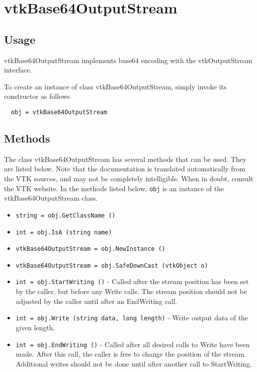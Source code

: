 \section{vtkBase64OutputStream}

\subsection{Usage}

 vtkBase64OutputStream implements base64 encoding with the
 vtkOutputStream interface.

To create an instance of class vtkBase64OutputStream, simply
invoke its constructor as follows
\begin{verbatim}
  obj = vtkBase64OutputStream
\end{verbatim}
\subsection{Methods}

The class vtkBase64OutputStream has several methods that can be used.
  They are listed below.
Note that the documentation is translated automatically from the VTK sources,
and may not be completely intelligible.  When in doubt, consult the VTK website.
In the methods listed below, \verb|obj| is an instance of the vtkBase64OutputStream class.
\begin{itemize}
\item  \verb|string = obj.GetClassName ()|

\item  \verb|int = obj.IsA (string name)|

\item  \verb|vtkBase64OutputStream = obj.NewInstance ()|

\item  \verb|vtkBase64OutputStream = obj.SafeDownCast (vtkObject o)|

\item  \verb|int = obj.StartWriting ()| -  Called after the stream position has been set by the caller, but
 before any Write calls.  The stream position should not be
 adjusted by the caller until after an EndWriting call.

\item  \verb|int = obj.Write (string data, long length)| -  Write output data of the given length.

\item  \verb|int = obj.EndWriting ()| -  Called after all desired calls to Write have been made.  After
 this call, the caller is free to change the position of the
 stream.  Additional writes should not be done until after another
 call to StartWriting.

\end{itemize}
